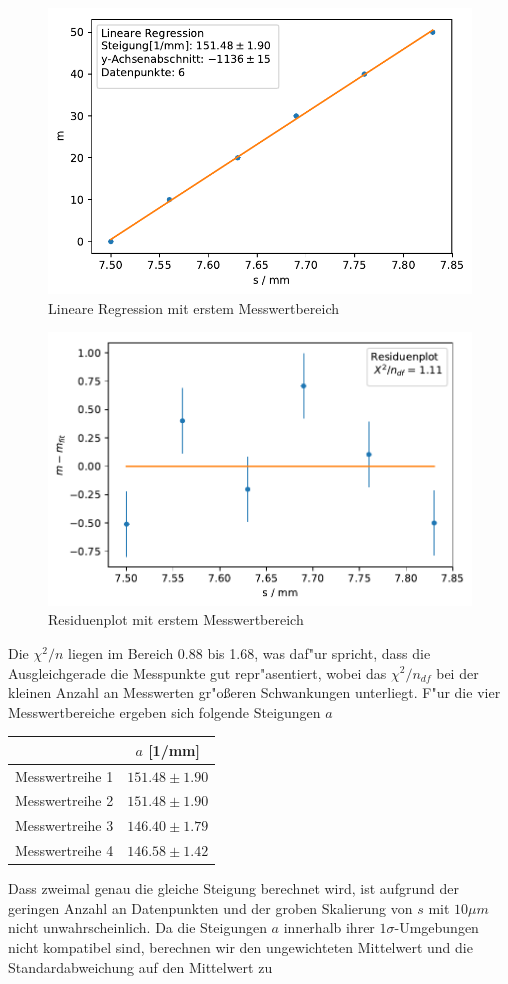 \documentclass[12pt,a4paper]{article}
\begin{document}
\begin{figure}[H]
	\centering
	\includegraphics[width=0.6\linewidth]{Python/Uebersetzungsfaktor1_LinReg.pdf}
	\caption{Lineare Regression mit erstem Messwertbereich}
	\label{k1LinReg}
\end{figure}
\begin{figure}[H]
	\centering
	\includegraphics[width=0.6\linewidth]{Python/Uebersetzungsfaktor1_Residuen.pdf}
	\caption{Residuenplot mit erstem Messwertbereich}
	\label{k1ResPlot}
\end{figure}
Die $\chi^2/n$ liegen im Bereich 0.88 bis 1.68, was daf"ur spricht, dass die Ausgleichgerade die Messpunkte gut repr"asentiert, wobei das $\chi^2/n_{df}$ bei der kleinen Anzahl an Messwerten gr"o\ss eren Schwankungen unterliegt. F"ur die vier Messwertbereiche ergeben sich folgende Steigungen $a$
\begin{center}
\begin{tabular}[H]{|c|c|}
	\hline
	&$a$ [1/mm]\\
	\hline
	Messwertreihe 1&$151.48\pm1.90$\\
	Messwertreihe 2&$151.48\pm1.90$\\
	Messwertreihe 3&$146.40\pm1.79$\\
	Messwertreihe 4&$146.58\pm1.42$\\
	\hline
\end{tabular}
\end{center}
Dass zweimal genau die gleiche Steigung berechnet wird, ist aufgrund der geringen Anzahl an Datenpunkten und der groben Skalierung von $s$ mit $10\mu m$ nicht unwahrscheinlich. Da die Steigungen $a$ innerhalb ihrer $1\sigma$-Umgebungen nicht kompatibel sind, berechnen wir den ungewichteten Mittelwert und die Standardabweichung auf den Mittelwert zu
\end{document}
